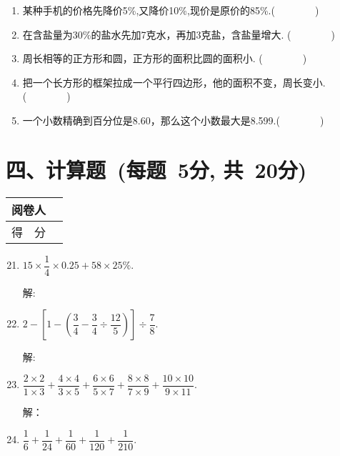 \documentclass[onecolumn,landscape,UTF8]{ctexart}
\newcommand{\putzdx}{\marginpar{
		\parbox{1cm}{\vspace{-1.6cm}
			\rotatebox[origin=c]{90}{
				\usebox{\zdx}
		}}
}}
\begin{document}
\begin{spacing}{1.3}
\begin{enumerate}
\item 某种手机的价格先降价5\%,又降价10\%,现价是原价的85\%.\hfill(~~~~~~~~)
\item 在含盐量为30\%的盐水先加7克水，再加3克盐，含盐量增大. \hfill(~~~~~~~~)
\item 周长相等的正方形和圆，正方形的面积比圆的面积小. \hfill(~~~~~~~~)
\item 把一个长方形的框架拉成一个平行四边形，他的面积不变，周长变小.\hfill(~~~~~~~~)
\item 一个小数精确到百分位是8.60，那么这个小数最大是8.599.\hfill(~~~~~~~~)		
\end{enumerate}

\newpage
		\putzdx %
		
		\section*{\hspace{5cm} 四、计算题~(每题~5分, 共~20分)}
		\vspace{-1cm}
		\begin{tabular}{|p{}|p{}|}
			\hline
			\centering  阅卷人&  \\
			\hline
			\centering 得~~分 &  \\
			\hline
		\end{tabular}
		\begin{enumerate}\setcounter{enumi}{20}
		
        \item $15\times\dfrac{1}{4}\times0.25+58\times25\%$.


		解:
        \vspace{2.5cm}

        \item  $2-[1-(\dfrac{3}{4}-\dfrac{3}{4}\div\dfrac{12}{5})]\div\dfrac{7}{8}$.


		解:
        \vspace{2.5cm}


        \item $\dfrac{2\times2}{1\times3}+\dfrac{4\times4}{3\times5}+\dfrac{6\times6}{5\times7}+\dfrac{8\times8}{7\times9}+\dfrac{10\times10}{9\times11}$.
			
        解：
        \vspace{2.5cm}

         \item $\dfrac{1}{6}+\dfrac{1}{24}+\dfrac{1}{60}+\dfrac{1}{120}+\dfrac{1}{210}$.
			

\end{enumerate}
\end{spacing}
\end{document}
